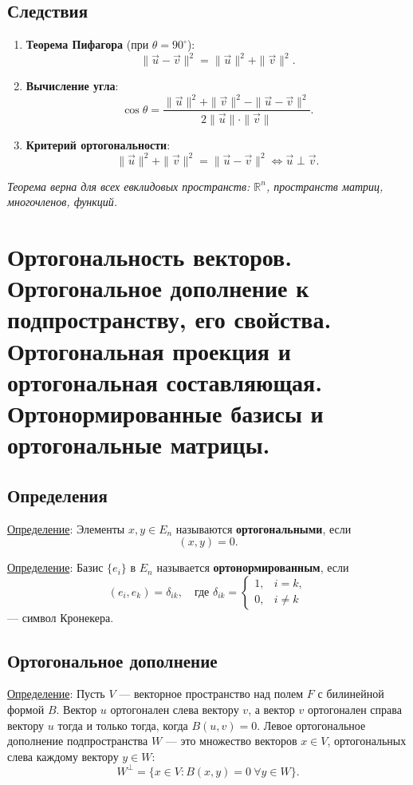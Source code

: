 \documentclass[12pt]{article}
\begin{document}
\subsection*{Следствия}
\begin{enumerate}
    \item \textbf{Теорема Пифагора} (при $\theta = 90^\circ$):
    $$
    \|\vec{u} - \vec{v}\|^2 = \|\vec{u}\|^2 + \|\vec{v}\|^2.
    $$
    \item \textbf{Вычисление угла}:
    $$
    \cos \theta = \frac{\|\vec{u}\|^2 + \|\vec{v}\|^2 - \|\vec{u} - \vec{v}\|^2}{2\|\vec{u}\| \cdot \|\vec{v}\|}.
    $$
    \item \textbf{Критерий ортогональности}:
    $$
    \|\vec{u}\|^2 + \|\vec{v}\|^2 = \|\vec{u} - \vec{v}\|^2 \iff \vec{u} \perp \vec{v}.
    $$
\end{enumerate}

\textit{Теорема верна для всех евклидовых пространств: $\mathbb{R}^n$, пространств матриц, многочленов, функций.}

\section{Ортогональность векторов. Ортогональное дополнение к подпространству, его свойства. Ортогональная проекция и ортогональная составляющая. Ортонормированные базисы и ортогональные матрицы.}

\subsection*{Определения}
\underline{Определение}: Элементы $x, y \in E_n$ называются \textbf{ортогональными}, если  
$$
(x, y) = 0.
$$

\underline{Определение}: Базис $\{e_i\}$ в $E_n$ называется \textbf{ортонормированным}, если  
$$
(e_i, e_k) = \delta_{ik}, \quad \text{где } \delta_{ik} = 
\begin{cases} 
1, & i = k, \\ 
0, & i \neq k 
\end{cases}
$$
— символ Кронекера.

\subsection*{Ортогональное дополнение}
\underline{Определение}: Пусть $V$ — векторное пространство над полем $F$ с билинейной формой $B$. Вектор $u$ ортогонален слева вектору $v$, а вектор $v$ ортогонален справа вектору $u$ тогда и только тогда, когда $B(u, v) = 0$. Левое ортогональное дополнение подпространства $W$ — это множество векторов $x \in V$, ортогональных слева каждому вектору $y \in W$:
$$
W^\perp = \{x \in V : B(x, y) = 0 \ \forall y \in W\}.
$$
\end{document}
